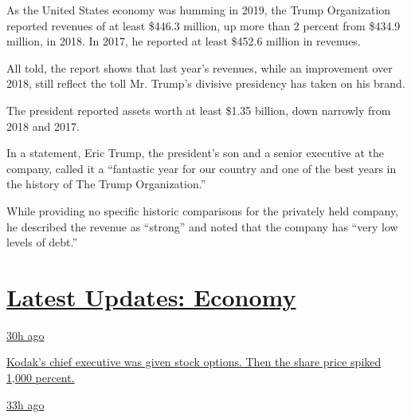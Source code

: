 As the United States economy was humming in 2019, the Trump Organization
reported revenues of at least \$446.3 million, up more than 2 percent
from \$434.9 million, in 2018. In 2017, he reported at least \$452.6
million in revenues.

All told, the report shows that last year's revenues, while an
improvement over 2018, still reflect the toll Mr. Trump's divisive
presidency has taken on his brand.

The president reported assets worth at least \$1.35 billion, down
narrowly from 2018 and 2017.

In a statement, Eric Trump, the president's son and a senior executive
at the company, called it a ``fantastic year for our country and one of
the best years in the history of The Trump Organization.''

While providing no specific historic comparisons for the privately held
company, he described the revenue as ``strong'' and noted that the
company has ``very low levels of debt.''

\hypertarget{latest-updates-economy}{%
\section{\texorpdfstring{\href{https://www.nytimes.com/live/2020/07/31/business/stock-market-today-coronavirus?action=click\&pgtype=Article\&state=default\&region=MAIN_CONTENT_1\&context=storylines_live_updates}{Latest
Updates:
Economy}}{Latest Updates: Economy}}\label{latest-updates-economy}}

\href{https://www.nytimes.com/live/2020/07/31/business/stock-market-today-coronavirus?action=click\&pgtype=Article\&state=default\&region=MAIN_CONTENT_1\&context=storylines_live_updates\#kodaks-chief-executive-was-given-stock-options-then-the-share-price-spiked-1000-percent}{30h
ago}

\href{https://www.nytimes.com/live/2020/07/31/business/stock-market-today-coronavirus?action=click\&pgtype=Article\&state=default\&region=MAIN_CONTENT_1\&context=storylines_live_updates\#kodaks-chief-executive-was-given-stock-options-then-the-share-price-spiked-1000-percent}{Kodak's
chief executive was given stock options. Then the share price spiked
1,000 percent.}

\href{https://www.nytimes.com/live/2020/07/31/business/stock-market-today-coronavirus?action=click\&pgtype=Article\&state=default\&region=MAIN_CONTENT_1\&context=storylines_live_updates\#fitch-ratings-downgrades-its-outlook-on-us-debt}{33h
ago}

